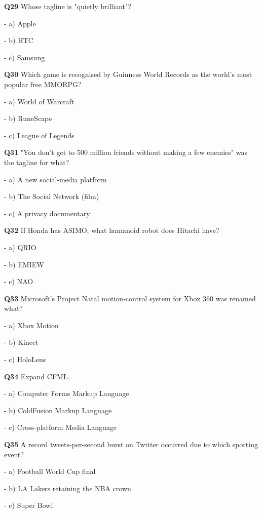 \textbf{Q29} Whose tagline is "quietly brilliant"?\par
\quad - a) Apple\par
\quad - b) HTC\par
\quad - c) Samsung\par

\textbf{Q30} Which game is recognised by Guinness World Records as the world's most popular free MMORPG?\par
\quad - a) World of Warcraft\par
\quad - b) RuneScape\par
\quad - c) League of Legends\par

\textbf{Q31} "You don't get to 500 million friends without making a few enemies" was the tagline for what?\par
\quad - a) A new social‑media platform\par
\quad - b) The Social Network (film)\par
\quad - c) A privacy documentary\par

\textbf{Q32} If Honda has ASIMO, what humanoid robot does Hitachi have?\par
\quad - a) QRIO\par
\quad - b) EMIEW\par
\quad - c) NAO\par

\textbf{Q33} Microsoft's Project Natal motion‑control system for Xbox 360 was renamed what?\par
\quad - a) Xbox Motion\par
\quad - b) Kinect\par
\quad - c) HoloLens\par

\textbf{Q34} Expand CFML.\par
\quad - a) Computer Forms Markup Language\par
\quad - b) ColdFusion Markup Language\par
\quad - c) Cross‑platform Media Language\par

\textbf{Q35} A record tweets‑per‑second burst on Twitter occurred due to which sporting event?\par
\quad - a) Football World Cup final\par
\quad - b) LA Lakers retaining the NBA crown\par
\quad - c) Super Bowl\par

